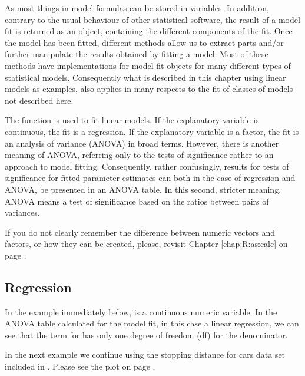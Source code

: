 \documentclass[krantz2]{krantz}\usepackage{knitr}%
\begin{document}
As most things in \Rlang model formulas can be stored in variables. In addition, contrary to the usual behaviour of other statistical software, the result of a model fit is returned as an object, containing the different components of the fit. Once the model has been fitted, different methods allow us to extract parts and/or further manipulate the results obtained by fitting a model. Most of these methods have implementations for model fit objects for many different types of statistical models. Consequently what is described in this chapter using linear models as examples, also applies in many respects to the fit of classes of models not described here.

The \Rlang function  is used to fit linear models. If the explanatory variable is continuous, the fit is a regression. If the explanatory variable is a factor, the fit is an analysis of variance (ANOVA) in broad terms. However, there is another meaning of ANOVA, referring only to the tests of significance rather to an approach to model fitting. Consequently, rather confusingly, results for tests of significance for fitted parameter estimates can both in the case of regression and ANOVA, be presented in an ANOVA table. In this second, stricter meaning, ANOVA means a test of significance based on the ratios between pairs of variances.

\begin{warningbox}
If you do not clearly remember the difference between numeric vectors and factors, or how they can be created, please, revisit Chapter \ref{chap:R:as:calc} on page \pageref{chap:R:as:calc}.
\end{warningbox}

\subsection{Regression}
In the example immediately below,  is a continuous numeric variable. In the ANOVA table calculated for the model fit, in this case a linear regression, we can see that the term for  has only one degree of freedom (df) for the denominator.

In the next example we continue using the stopping distance for cars data set included in \Rpgrm. Please see the plot on page \pageref{chunk:plot:cars}.
\label{xmpl:fun:lm:fm1}
\end{document}
